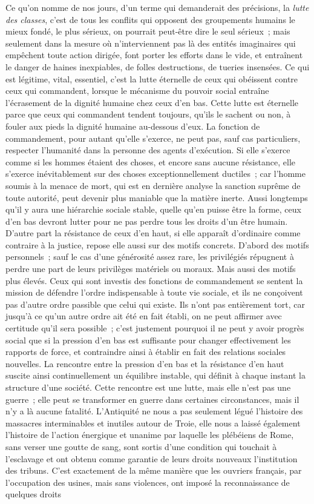 \documentclass[french,twoside]{book} %
\begin{document}
\noindent Ce qu'on nomme de nos jours, d'un terme qui demanderait des précisions, la {\itshape lutte des classes}, c'est de tous les conflits qui opposent des groupements humains le mieux fondé, le plus sérieux, on pourrait peut-être dire le seul sérieux ; mais seulement dans la mesure où n'interviennent pas là des entités imaginaires qui empêchent toute action dirigée, font porter les efforts dans le vide, et entraînent le danger de haines inexpiables, de folles destructions, de tueries insensées. Ce qui est légitime, vital, essentiel, c'est la lutte éternelle de ceux qui obéissent contre ceux qui commandent, lorsque le mécanisme du pouvoir social entraîne l'écrasement de la dignité humaine chez ceux d'en bas. Cette lutte est éternelle parce que ceux qui commandent tendent toujours, qu'ils le sachent ou non, à fouler aux pieds la dignité humaine au-dessous d'eux. La fonction de commandement, pour autant qu'elle s'exerce, ne peut pas, sauf cas particuliers, respecter l'humanité dans la personne des agents d'exécution. Si elle s'exerce comme si les hommes étaient des choses, et encore sans aucune résistance, elle s'exerce inévitablement sur des choses exceptionnellement ductiles ; car l'homme soumis à la menace de mort, qui est en dernière analyse la sanction suprême de toute autorité, peut devenir plus maniable que la matière inerte. Aussi longtemps qu'il y aura une hiérarchie sociale stable, quelle qu'en puisse être la forme, ceux d'en bas devront lutter pour ne pas perdre tous les droits d'un être humain. D'autre part la résistance de ceux d'en haut, si elle apparaît d'ordinaire comme contraire à la justice, repose elle aussi sur des motifs concrets. D'abord des motifs personnels ; sauf le cas d'une générosité assez rare, les privilégiés répugnent à perdre une part de leurs privilèges matériels ou moraux. Mais aussi des motifs plus élevés. Ceux qui sont investis des fonctions de commandement se sentent la mission de défendre l'ordre indispensable à toute vie sociale, et ils ne conçoivent pas d'autre ordre passible que celui qui existe. Ils n'ont pas entièrement tort, car jusqu'à ce qu'un autre ordre ait été en fait établi, on ne peut affirmer avec certitude qu'il sera possible ; c'est justement pourquoi il ne peut y avoir progrès social que si la pression d'en bas est suffisante pour changer effectivement les rapports de force, et contraindre ainsi à établir en fait des relations sociales nouvelles. La rencontre entre la pression d'en bas et la résistance d'en haut suscite ainsi continuellement un équilibre instable, qui définit à chaque instant la structure d'une société. Cette rencontre est une lutte, mais elle n'est pas une guerre ; elle peut se transformer en guerre dans certaines circonstances, mais il n'y a là aucune fatalité. L'Antiquité ne nous a pas seulement légué l'histoire des massacres interminables et inutiles autour de Troie, elle nous a laissé également l'histoire de l'action énergique et unanime par laquelle les plébéiens de Rome, sans verser une goutte de sang, sont sortis d'une condition qui touchait à l'esclavage et ont obtenu comme garantie de leurs droits nouveaux l'institution des tribuns. C'est exactement de la même manière que les ouvriers français, par l'occupation des usines, mais sans violences, ont imposé la reconnaissance de quelques droits 
\end{document}
